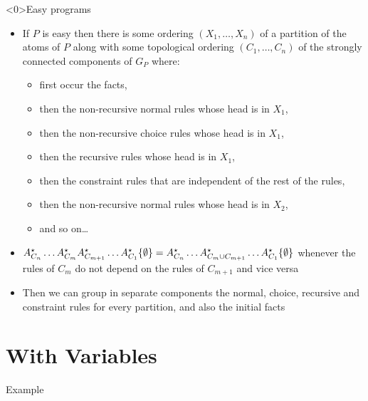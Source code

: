 \begin{frame}<0>{Easy programs}
  \begin{itemize}
    \item If $P$ is easy then there is 
          some ordering $(X_1, \ldots, X_n)$ of a partition of the atoms of $P$ along with
          some topological ordering
          $(C_1, \ldots, C_n)$ of the strongly connected components of $G_P$
          where:
    \begin{itemize}
      \item first occur the facts, 
      \item then the non-recursive normal rules whose head is in $X_1$, 
      \item then the non-recursive choice rules whose head is in $X_1$, 
      \item then the recursive rules whose head is in $X_1$, 
      \item then the constraint rules that are independent of the rest of the rules,
      \item then the non-recursive normal rules whose head is in $X_2$, 
      \item and so on\ldots
    \end{itemize}
      \item $A_{C_n}^{\star}\ldots A_{C_m}^{\star}A_{C_{m+1}}^{\star}\ldots A_{C_1}^{\star}\{\emptyset\} =
             A_{C_n}^{\star}\ldots A_{C_m \cup C_{m+1}}^{\star}\ldots A_{C_1}^{\star}\{\emptyset\}$ whenever 
            the rules of $C_m$ do not depend on the rules of $C_{m+1}$ and vice versa
    \item Then we can group in separate components
          the normal, choice, recursive  and constraint rules for every partition, and also the initial facts
  \end{itemize}
\end{frame}

\section{With Variables}

\begin{frame}{Example}
\todo
\end{frame}

